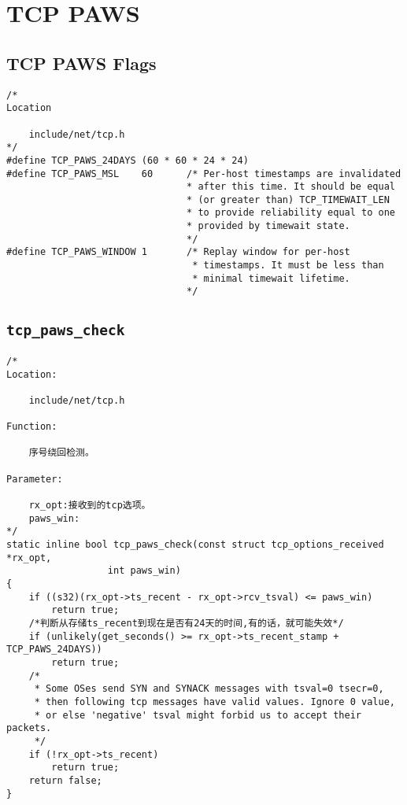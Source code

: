 \section{TCP PAWS}
    \subsection{TCP PAWS Flags}
\begin{verbatim}
/*
Location

    include/net/tcp.h
*/
#define TCP_PAWS_24DAYS (60 * 60 * 24 * 24)
#define TCP_PAWS_MSL    60      /* Per-host timestamps are invalidated
                                * after this time. It should be equal
                                * (or greater than) TCP_TIMEWAIT_LEN
                                * to provide reliability equal to one
                                * provided by timewait state.
                                */
#define TCP_PAWS_WINDOW 1       /* Replay window for per-host
                                 * timestamps. It must be less than
                                 * minimal timewait lifetime.
                                */
\end{verbatim}

    \subsection{\texttt{tcp_paws_check}}

\begin{verbatim}
/*
Location:

    include/net/tcp.h

Function:

    序号绕回检测。

Parameter:
    
    rx_opt:接收到的tcp选项。
    paws_win:
*/
static inline bool tcp_paws_check(const struct tcp_options_received *rx_opt,
                  int paws_win)
{
    if ((s32)(rx_opt->ts_recent - rx_opt->rcv_tsval) <= paws_win)
        return true;
    /*判断从存储ts_recent到现在是否有24天的时间,有的话，就可能失效*/
    if (unlikely(get_seconds() >= rx_opt->ts_recent_stamp + TCP_PAWS_24DAYS))
        return true;
    /*
     * Some OSes send SYN and SYNACK messages with tsval=0 tsecr=0,
     * then following tcp messages have valid values. Ignore 0 value,
     * or else 'negative' tsval might forbid us to accept their packets.
     */
    if (!rx_opt->ts_recent)
        return true;
    return false;
}
\end{verbatim}
